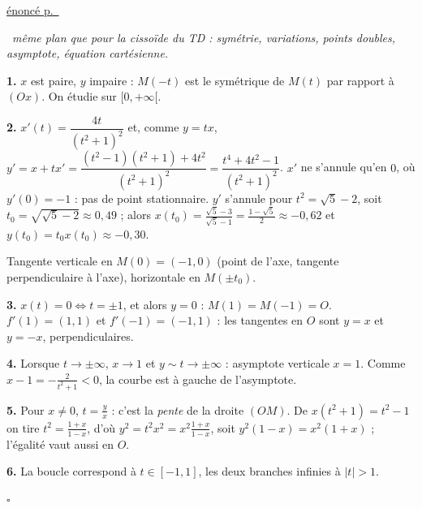 \documentclass[a4paper,11pt]{article}
\numberwithin{equation}{section}
\numberwithin{figure}{section}
\numberwithin{table}{section}
\theoremstyle{enonce}
\theoremstyle{exemple}
\theoremstyle{remarque}
\newenvironment{corrige}[1]{%
  \par\needspace{6\baselineskip}\vspace{1em}\phantomsection\label{c:#1}%
  \noindent{\sffamily\bfseries\color{Bleu}Exercice~\ref{e:#1}}\quad
  {\scriptsize\sffamily\hyperref[e:#1]{\color{Gris}énoncé p.~\pageref{e:#1}}}\par\nobreak\vspace{0.2em}}%
  {\hfill\textcolor{BleuClair}{$\square$}\par}
\newcommand{\demarche}[1]{\noindent{\sffamily\bfseries\small\color{BleuMoyen}Démarche.}\ \textit{#1}\par\smallskip}
\begin{document}
\begin{corrige}{strophoide}
\demarche{même plan que pour la cissoïde du TD : symétrie, variations, points doubles, asymptote, équation cartésienne.}
\textbf{1.} $x$ est paire, $y$ impaire : $M(-t)$ est le symétrique de $M(t)$ par rapport à $(Ox)$. On étudie sur $[0,+\infty[$.

\textbf{2.} $x'(t)=\dfrac{4t}{(t^2+1)^2}$ et, comme $y=tx$, $y'=x+tx'=\dfrac{(t^2-1)(t^2+1)+4t^2}{(t^2+1)^2}=\dfrac{t^4+4t^2-1}{(t^2+1)^2}$.
$x'$ ne s'annule qu'en $0$, où $y'(0)=-1$ : pas de point stationnaire. $y'$ s'annule pour $t^2=\sqrt5-2$, soit
$t_0=\sqrt{\sqrt5-2}\approx0{,}49$ ; alors $x(t_0)=\frac{\sqrt5-3}{\sqrt5-1}=\frac{1-\sqrt5}2\approx-0{,}62$ et
$y(t_0)=t_0x(t_0)\approx-0{,}30$.
\begin{center}
\end{center}
Tangente verticale en $M(0)=(-1,0)$ (point de l'axe, tangente perpendiculaire à l'axe), horizontale en $M(\pm t_0)$.

\textbf{3.} $x(t)=0\iff t=\pm1$, et alors $y=0$ : $M(1)=M(-1)=O$. $f'(1)=(1,1)$ et $f'(-1)=(-1,1)$ : les tangentes en $O$ sont
$y=x$ et $y=-x$, perpendiculaires.

\textbf{4.} Lorsque $t\to\pm\infty$, $x\to1$ et $y\sim t\to\pm\infty$ : asymptote verticale $x=1$. Comme
$x-1=-\frac2{t^2+1}<0$, la courbe est à gauche de l'asymptote.

\textbf{5.} Pour $x\neq0$, $t=\frac yx$ : c'est la \emph{pente} de la droite $(OM)$. De $x(t^2+1)=t^2-1$ on tire
$t^2=\frac{1+x}{1-x}$, d'où $y^2=t^2x^2=x^2\frac{1+x}{1-x}$, soit $y^2(1-x)=x^2(1+x)$ ; l'égalité vaut aussi en $O$.

\textbf{6.} La boucle correspond à $t\in[-1,1]$, les deux branches infinies à $|t|>1$.
\begin{center}
\end{center}
\end{corrige}
\end{document}
